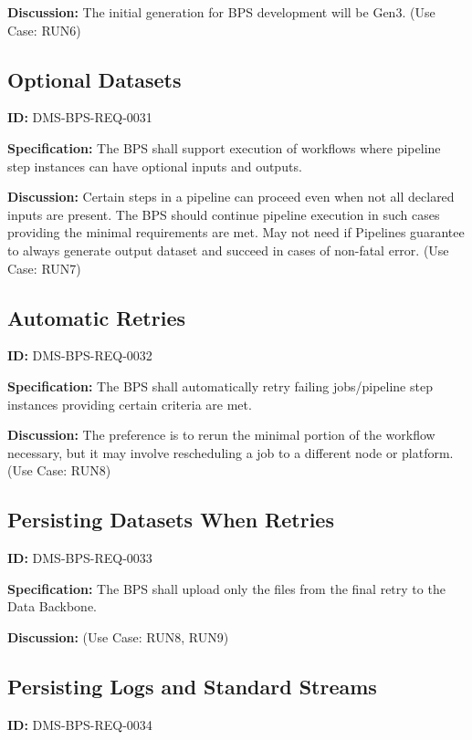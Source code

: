 \documentclass[SE,toc]{lsstdoc}
\begin{document}
\textbf{Discussion:}
The initial generation for BPS development will be Gen3.  (Use Case: RUN6)

\subsection{Optional Datasets}

\label{DMS-BPS-REQ-0031}
\textbf{ID:} DMS-BPS-REQ-0031

\textbf{Specification:}
The BPS shall support execution of workflows where pipeline step instances can have optional inputs and outputs.

\textbf{Discussion:}
Certain steps in a pipeline can proceed even when not all declared inputs are present. The BPS should continue pipeline execution in such cases providing the minimal requirements are met.   May not need if Pipelines guarantee to always generate output dataset and succeed in cases of non-fatal error.  (Use Case: RUN7)

\subsection{Automatic Retries}

\label{DMS-BPS-REQ-0032}
\textbf{ID:} DMS-BPS-REQ-0032

\textbf{Specification:}
The BPS shall automatically retry failing jobs/pipeline step instances providing certain criteria are met.

\textbf{Discussion:}
The preference is to rerun the minimal portion of the workflow necessary, but it may involve rescheduling a job to a different node or platform.  (Use Case: RUN8)

\subsection{Persisting Datasets When Retries}

\label{DMS-BPS-REQ-0033}
\textbf{ID:} DMS-BPS-REQ-0033

\textbf{Specification:}
The BPS shall upload only the files from the final retry to the Data Backbone.

\textbf{Discussion:}
(Use Case: RUN8, RUN9)

\subsection{Persisting Logs and Standard Streams}

\label{DMS-BPS-REQ-0034}
\textbf{ID:} DMS-BPS-REQ-0034
\end{document}
